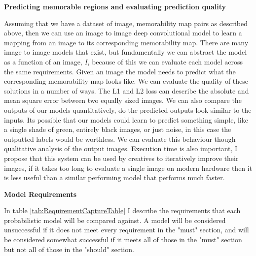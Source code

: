 \documentclass{UoYCSproject}
\begin{document}
\textbf{Predicting memorable regions and evaluating prediction quality}

Assuming that we have a dataset of image, memorability map pairs as described above, then we can use an image to image deep convolutional model to learn a mapping from an image to its corresponding memorability map. 
There are many image to image models that exist, but fundamentally we can abstract the model as a function of an image, $I$, because of this we can evaluate each model across the same requirements. 
Given an image the model needs to predict what the corresponding memorability map looks like.
We can evaluate the quality of these solutions in a number of ways. The L1 and L2 loss can describe the absolute and mean square error between two equally sized images. We can also compare the outputs of our models quantitatively, do the predicted outputs look similar to the inputs. Its possible that our models could learn to predict something simple, like a single shade of green, entirely black images, or just noise, in this case the outputted labels would be worthless. We can evaluate this behaviour though qualitative analysis of the output images. Execution time is also important, I propose that this system can be used by creatives to iteratively improve their images, if it takes too long to evaluate a single image on modern hardware then it is less useful than a similar performing model that performs much faster.

\textbf{Model Requirements}

In table \ref{tab:RequirementCaptureTable} I describe the requirements that each probabilistic model will be compared against. A model will be considered unsuccessful if it does not meet every requirement in the "must" section, and will be considered somewhat successful if it meets all of those in the "must" section but not all of those in the "should" section.
\end{document}

